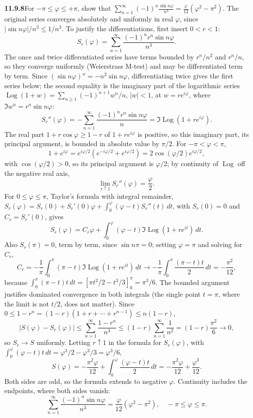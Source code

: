 \par\bigskip
\noindent\textbf{11.9.8}\quad For $-\pi\le\varphi\le+\pi$, show that
$\displaystyle\sum_{n=1}^{\infty}(-1)^{n}\frac{\sin n\varphi}{n^{3}}
=\frac{\varphi}{12}(\varphi^{2}-\pi^{2})$.
\solution
The original series converges absolutely and uniformly in real
$\varphi$, since $|\sin n\varphi|/n^3\le1/n^3$.
To justify the differentiations, first insert $0<r<1$:
\[
S_r(\varphi)=\sum_{n=1}^{\infty}
\frac{(-1)^nr^n\sin n\varphi}{n^3}.
\]
The once and twice differentiated series have terms bounded by
$r^n/n^2$ and $r^n/n$, so they converge uniformly (Weierstrass
M-test) and may be differentiated term by term. Since
$(\sin n\varphi)''=-n^2\sin n\varphi$, differentiating twice gives the
first series below; the second equality is the imaginary part of the
logarithmic series
$\operatorname{Log}(1+w)=\sum_{n\ge1}(-1)^{n+1}w^n/n$, $|w|<1$, at
$w=re^{i\varphi}$, where $\Im w^n=r^n\sin n\varphi$:
\[
S_r''(\varphi)
=-\sum_{n=1}^{\infty}\frac{(-1)^nr^n\sin n\varphi}{n}
=\Im\operatorname{Log}(1+re^{i\varphi}).
\]
The real part $1+r\cos\varphi\ge1-r$ of $1+re^{i\varphi}$ is
positive, so this imaginary part, its principal argument, is bounded
in absolute value by $\pi/2$. For $-\pi<\varphi<\pi$,
\[
1+e^{i\varphi}=e^{i\varphi/2}(e^{-i\varphi/2}+e^{i\varphi/2})
=2\cos(\varphi/2)e^{i\varphi/2},
\]
with $\cos(\varphi/2)>0$, so its principal argument is $\varphi/2$;
by continuity of $\operatorname{Log}$ off the negative real axis,
\[
\lim_{r\uparrow1}S_r''(\varphi)=\frac{\varphi}{2}.
\]
For $0\le\varphi\le\pi$, Taylor's formula with integral remainder,
$S_r(\varphi)=S_r(0)+S_r'(0)\varphi
+\int_0^\varphi(\varphi-t)S_r''(t)\,dt$, with $S_r(0)=0$ and
$C_r=S_r'(0)$, gives
\[
S_r(\varphi)=C_r\varphi+
\int_0^\varphi(\varphi-t)\Im\operatorname{Log}(1+re^{it})\,dt.
\]
Also $S_r(\pi)=0$, term by term, since $\sin n\pi=0$; setting
$\varphi=\pi$ and solving for $C_r$,
\[
C_r=-\frac1\pi\int_0^\pi(\pi-t)
\Im\operatorname{Log}(1+re^{it})\,dt
\longrightarrow
-\frac1\pi\int_0^\pi\frac{(\pi-t)t}{2}\,dt
=-\frac{\pi^2}{12},
\]
because
$\int_0^\pi(\pi-t)t\,dt=[\pi t^2/2-t^3/3]_0^\pi=\pi^3/6$.
The bounded argument justifies dominated convergence in both integrals
(the single point $t=\pi$, where the limit is not $t/2$, does not
matter). Since $0\le1-r^n=(1-r)(1+r+\cdots+r^{n-1})\le n(1-r)$,
\[
|S(\varphi)-S_r(\varphi)|\le\sum_{n=1}^{\infty}\frac{1-r^n}{n^3}
\le(1-r)\sum_{n=1}^{\infty}\frac1{n^2}=(1-r)\frac{\pi^2}{6}\to0,
\]
so $S_r\to S$ uniformly. Letting $r\uparrow1$ in the formula for
$S_r(\varphi)$, with
$\int_0^\varphi(\varphi-t)t\,dt=\varphi^3/2-\varphi^3/3=\varphi^3/6$,
\[
S(\varphi)=-\frac{\pi^2\varphi}{12}
+\int_0^\varphi\frac{(\varphi-t)t}{2}\,dt
=-\frac{\pi^2\varphi}{12}+\frac{\varphi^3}{12}.
\]
Both sides are odd, so the formula extends to negative $\varphi$.
Continuity includes the endpoints, where both sides vanish:
\[
\boxed{\sum_{n=1}^{\infty}\frac{(-1)^n\sin n\varphi}{n^3}
=\frac{\varphi}{12}(\varphi^2-\pi^2),
\quad -\pi\le\varphi\le\pi}.
\]

